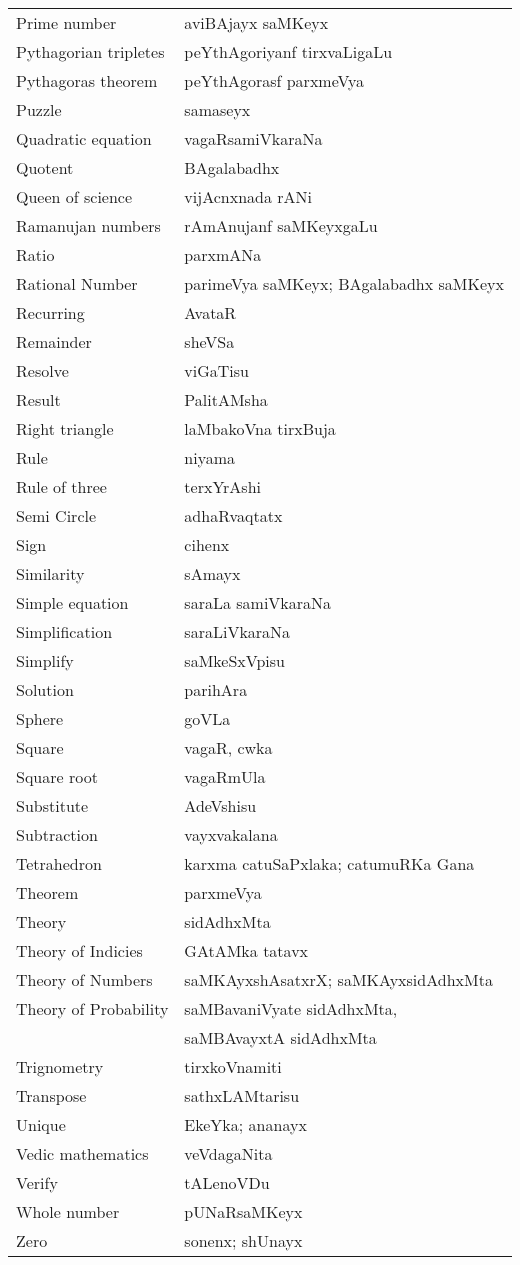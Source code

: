 {\begin{longtable}{>{\rm}l@{\hspace{1cm}}l}
Prime number & aviBAjayx saMKeyx\\
Pythagorian tripletes & peYthAgoriyanf tirxvaLigaLu\\
Pythagoras theorem & peYthAgorasf parxmeVya\\
Puzzle & samaseyx\\
Quadratic equation & vagaRsamiVkaraNa\\
Quotent & BAgalabadhx\\
Queen of science & vijAcnxnada rANi\\
Ramanujan numbers & rAmAnujanf saMKeyxgaLu\\
Ratio & parxmANa\\
Rational Number & parimeVya saMKeyx; BAgalabadhx saMKeyx\\
Recurring & AvataR\\
Remainder & sheVSa\\
Resolve & viGaTisu\\
Result & PalitAMsha\\
Right triangle & laMbakoVna tirxBuja\\
Rule & niyama\\
Rule of three & terxYrAshi\\
Semi Circle & adhaRvaqtatx\\
Sign & cihenx\\
Similarity & sAmayx\\
Simple equation & saraLa samiVkaraNa\\
Simplification & saraLiVkaraNa\\
Simplify & saMkeSxVpisu\\
Solution & parihAra\\
Sphere & goVLa\\
Square & vagaR, cwka\\
Square root & vagaRmUla\\
Substitute & AdeVshisu\\
Subtraction & vayxvakalana\\
Tetrahedron & karxma catuSaPxlaka; catumuRKa Gana\\
Theorem & parxmeVya\\
Theory & sidAdhxMta\\
Theory of Indicies & GAtAMka tatavx\\
Theory of Numbers & saMKAyxshAsatxrX; saMKAyxsidAdhxMta\\
Theory of Probability & saMBavaniVyate sidAdhxMta,\\[-0.1cm] 
 &saMBAvayxtA sidAdhxMta\\
Trignometry & tirxkoVnamiti\\
Transpose & sathxLAMtarisu\\
Unique & EkeYka; ananayx\\
Vedic mathematics & veVdagaNita\\
Verify & tALenoVDu\\
Whole number & pUNaRsaMKeyx\\
Zero & sonenx; shUnayx
\end{longtable}

}
